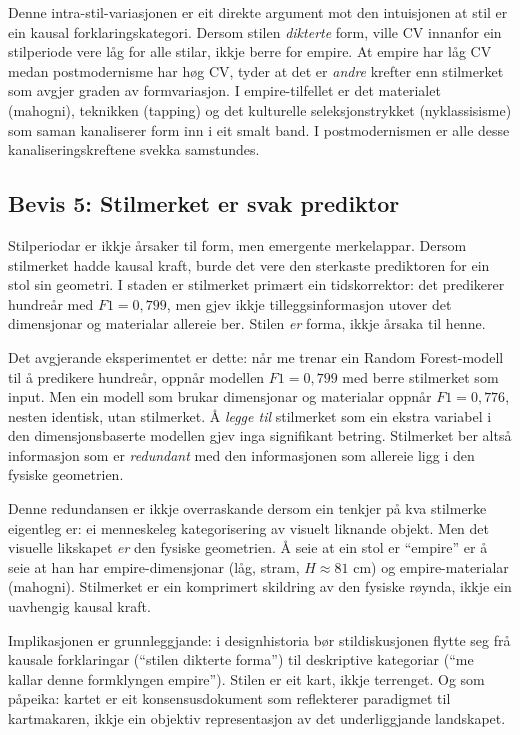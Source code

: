 \documentclass[10pt, a4paper, twocolumn]{article}
\begin{document}
Denne intra-stil-variasjonen er eit direkte argument mot den intuisjonen at stil er ein kausal forklaringskategori. Dersom stilen \emph{dikterte} form, ville CV innanfor ein stilperiode vere låg for alle stilar, ikkje berre for empire. At empire har låg CV medan postmodernisme har høg CV, tyder at det er \emph{andre} krefter enn stilmerket som avgjer graden av formvariasjon. I empire-tilfellet er det materialet (mahogni), teknikken (tapping) og det kulturelle seleksjonstrykket (nyklassisisme) som saman kanaliserer form inn i eit smalt band. I postmodernismen er alle desse kanaliseringskreftene svekka samstundes.


\subsection{Bevis 5: Stilmerket er svak prediktor}

Stilperiodar er ikkje årsaker til form, men emergente merkelappar. Dersom stilmerket hadde kausal kraft, burde det vere den sterkaste prediktoren for ein stol sin geometri. I staden er stilmerket primært ein tidskorrektor: det predikerer hundreår med $F1 = 0{,}799$, men gjev ikkje tilleggsinformasjon utover det dimensjonar og materialar allereie ber. Stilen \emph{er} forma, ikkje årsaka til henne.

Det avgjerande eksperimentet er dette: når me trenar ein Random Forest-modell til å predikere hundreår, oppnår modellen $F1 = 0{,}799$ med berre stilmerket som input. Men ein modell som brukar dimensjonar og materialar oppnår $F1 = 0{,}776$, nesten identisk, utan stilmerket. Å \emph{legge til} stilmerket som ein ekstra variabel i den dimensjonsbaserte modellen gjev inga signifikant betring. Stilmerket ber altså informasjon som er \emph{redundant} med den informasjonen som allereie ligg i den fysiske geometrien.

Denne redundansen er ikkje overraskande dersom ein tenkjer på kva stilmerke eigentleg er: ei menneskeleg kategorisering av visuelt liknande objekt. Men det visuelle likskapet \emph{er} den fysiske geometrien. Å seie at ein stol er ``empire'' er å seie at han har empire-dimensjonar (låg, stram, $H \approx 81$ cm) og empire-materialar (mahogni). Stilmerket er ein komprimert skildring av den fysiske røynda, ikkje ein uavhengig kausal kraft.

Implikasjonen er grunnleggjande: i designhistoria bør stildiskusjonen flytte seg frå kausale forklaringar (``stilen dikterte forma'') til deskriptive kategoriar (``me kallar denne formklyngen empire''). Stilen er eit kart, ikkje terrenget. Og som \citet{kuhn1962} påpeika: kartet er eit konsensusdokument som reflekterer paradigmet til kartmakaren, ikkje ein objektiv representasjon av det underliggjande landskapet.
\end{document}
